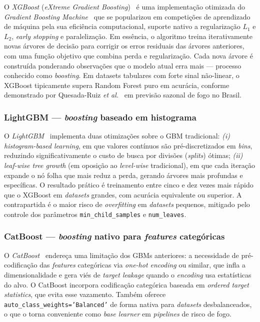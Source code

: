 \documentclass[tcc2]{uftex}
\begin{document}
O \emph{XGBoost} (\emph{eXtreme Gradient Boosting})~\cite{chen2016xgboost} é uma implementação otimizada do \emph{Gradient Boosting Machine}~\cite{friedman2001greedy} que se popularizou em competições de aprendizado de máquina pela sua eficiência computacional, suporte nativo a regularização \(L_1\) e \(L_2\), \emph{early stopping} e paralelização. Em essência, o algoritmo treina iterativamente novas árvores de decisão para corrigir os erros residuais das árvores anteriores, com uma função objetivo que combina perda e regularização. Cada nova árvore é construída ponderando observações que o modelo atual erra mais --- processo conhecido como \emph{boosting}. Em datasets tabulares com forte sinal não-linear, o XGBoost tipicamente supera Random Forest puro em acurácia, conforme demonstrado por Quesada-Ruiz \emph{et al.}~\cite{npjhazards2025fire} em previsão sazonal de fogo no Brasil.

\subsubsection{LightGBM --- \emph{boosting} baseado em histograma}
\label{subsec:fund_lightgbm}

O \emph{LightGBM}~\cite{ke2017lightgbm} implementa duas otimizações sobre o GBM tradicional: \emph{(i)} \emph{histogram-based learning}, em que valores contínuos são pré-discretizados em \emph{bins}, reduzindo significativamente o custo de busca por divisões (\emph{splits}) ótimas; \emph{(ii)} \emph{leaf-wise tree growth} (em oposição ao \emph{level-wise} tradicional), em que cada iteração expande o nó folha que mais reduz a perda, gerando árvores mais profundas e específicas. O resultado prático é treinamento entre cinco e dez vezes mais rápido que o XGBoost em \emph{datasets} grandes, com acurácia equivalente ou superior. A contrapartida é o maior risco de \emph{overfitting} em \emph{datasets} pequenos, mitigado pelo controle dos parâmetros \texttt{min\_child\_samples} e \texttt{num\_leaves}.

\subsubsection{CatBoost --- \emph{boosting} nativo para \emph{features} categóricas}
\label{subsec:fund_catboost}

O \emph{CatBoost}~\cite{prokhorenkova2018catboost} endereça uma limitação dos GBMs anteriores: a necessidade de pré-codificação das \emph{features} categóricas via \emph{one-hot encoding} ou similar, que infla a dimensionalidade e gera viés de \emph{target leakage} quando o \emph{encoding} usa estatísticas do alvo. O CatBoost incorpora codificação categórica baseada em \emph{ordered target statistics}, que evita esse vazamento. Também oferece \texttt{auto\_class\_weights='Balanced'} de forma nativa para \emph{datasets} desbalanceados, o que o torna conveniente como \emph{base learner} em \emph{pipelines} de risco de fogo.
\end{document}
